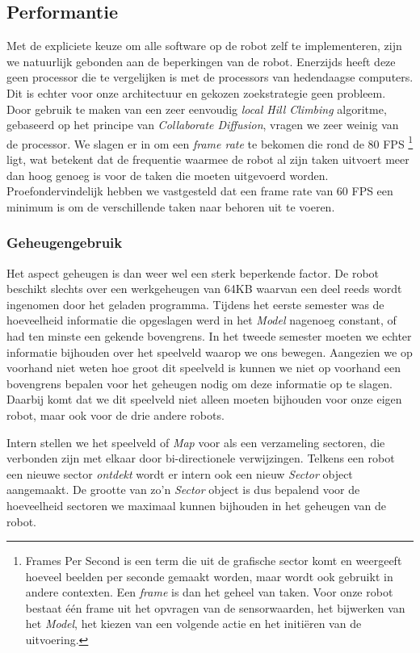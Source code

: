 \documentclass[12pt,a4paper]{report}
\begin{document}
\subsection{Performantie}
\label{sect:performance}

Met de expliciete keuze om alle software op de robot zelf te implementeren, zijn we natuurlijk gebonden aan de beperkingen van de robot. Enerzijds heeft deze geen processor die te vergelijken is met de processors van hedendaagse computers. Dit is echter voor onze architectuur en gekozen zoekstrategie geen probleem. Door gebruik te maken van een zeer eenvoudig \emph{local Hill Climbing} algoritme, gebaseerd op het principe van \emph{Collaborate Diffusion}, vragen we zeer weinig van de processor. We slagen er in om een \emph{frame rate} te bekomen die rond de 80 FPS \footnote{Frames Per Second is een term die uit de grafische sector komt en weergeeft hoeveel beelden per seconde gemaakt worden, maar wordt ook gebruikt in andere contexten. Een \emph{frame} is dan het geheel van taken. Voor onze robot bestaat \'e\'en frame uit het opvragen van de sensorwaarden, het bijwerken van het \emph{Model}, het kiezen van een volgende actie en het initi\"eren van de uitvoering.} ligt, wat betekent dat de frequentie waarmee de robot al zijn taken uitvoert meer dan hoog genoeg is voor de taken die moeten uitgevoerd worden. Proefondervindelijk hebben we vastgesteld dat een frame rate van 60 FPS een minimum is om de verschillende taken naar behoren uit te voeren.

\subsubsection{Geheugengebruik}

Het aspect geheugen is dan weer wel een sterk beperkende factor. De robot beschikt slechts over een werkgeheugen van 64KB waarvan een deel reeds wordt ingenomen door het geladen programma. Tijdens het eerste semester was de hoeveelheid informatie die opgeslagen werd in het \emph{Model} nagenoeg constant, of had ten minste een gekende bovengrens. In het tweede semester moeten we echter informatie bijhouden over het speelveld waarop we ons bewegen. Aangezien we op voorhand niet weten hoe groot dit speelveld is kunnen we niet op voorhand een bovengrens bepalen voor het geheugen nodig om deze informatie op te slagen. Daarbij komt dat we dit speelveld niet alleen moeten bijhouden voor onze eigen robot, maar ook voor de drie andere robots.

Intern stellen we het speelveld of \emph{Map} voor als een verzameling sectoren, die verbonden zijn met elkaar door bi-directionele verwijzingen. Telkens een robot een nieuwe sector \emph{ontdekt} wordt er intern ook een nieuw \emph{Sector} object aangemaakt. De grootte van zo'n \emph{Sector} object is dus bepalend voor de hoeveelheid sectoren we maximaal kunnen bijhouden in het geheugen van de robot.
\end{document}
